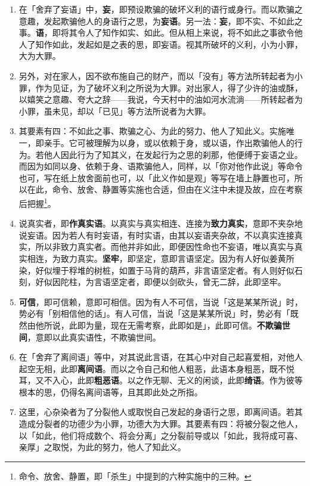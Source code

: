 \begin{enumerate}\item 在「舍弃了妄语」中，\textbf{妄}，即预设欺骗的破坏义利的语行或身行。而以欺骗之意趣，发起欺骗他人的身语行之思，为\textbf{妄语}。另一法：\textbf{妄}，即不实、不如此之事。\textbf{语}，即将其令人了知作如实、如此。但从相上来说，将不如此之事欲令他人了知作如此，发起如是之表的思，即妄语。视其所破坏的义利，小为小罪，大为大罪。
\item 另外，对在家人，因不欲布施自己的财产，而以「没有」等方法所转起者为小罪，作为见证，为了破坏义利之所说为大罪。对出家人，得了少许的油或酥，以嬉笑之意趣、夸大之辞——我说，今天村中的油如河水流淌——所转起者为小罪，虽未见，却以「已见」等方法所说者为大罪。
\item 其要素有四：不如此之事、欺骗之心、为此的努力、他人了知此义。实施唯一，即亲手。它可被理解为以身，或以依赖于身，或以语，作出欺骗他人的行为。若他人因此行为了知其义，在发起行为之思的刹那，他便缚于妄语之业。而因为如同以身、依赖于身、语欺骗他人，同样，以「你对他作此说」等命令也可，写在纸上放舍面前也可，以「此义作如是观」等写在墙上静置也可，所以在此，命令、放舍、静置等实施也合适，但由在义注中未提及故，应在考察后把握\footnote{命令、放舍、静置，即「杀生」中提到的六种实施中的三种。}。
\item 说真实者，即\textbf{作真实语}。以真实与真实相连、连接为\textbf{致力真实}，意即不夹杂地说妄语。因为若人有时妄语，有时实语，由其以妄语夹杂故，不以真实连接真实，所以非致力真实者。而他并非如此，即便因性命也不妄语，唯以真实与真实相连，为致力真实。\textbf{坚牢}，即坚定，意即言语坚定。因为有人好似姜黄所染，好似埋于稃堆的树桩，如置于马背的葫芦，非言语坚定者。有人则好似石刻，好似因陀柱，为言语坚定者，即便以剑砍头，曾无二辞，此即坚牢。
\item \textbf{可信}，即可信赖，意即可相信。因为有人不可信，当说「这是某某所说」时，势必有「别相信他的话」。有人可信，当说「这是某某所说」时，势必有「既然由他所说，此即为量，现在无需考察，此即如是」，此即可信。\textbf{不欺骗世间}，意即以此真实语性，不欺骗世间。
\item 在「舍弃了离间语」等中，对其说此言语，在其心中对自己起喜爱相，对他人起空无相，此即\textbf{离间语}。而以之令自己和他人粗恶，此语本身粗恶，既不悦耳，又不入心，此即\textbf{粗恶语}。以之作无聊、无义的闲谈，此即\textbf{绮语}。作为彼等根本的思，仍得名离间语等，且其即此处之所指。
\item 这里，心杂染者为了分裂他人或取悦自己发起的身语行之思，即离间语。若其造成分裂者的功德少为小罪，功德大为大罪。其要素有四：将被分裂之他人，以「如此，他们将成数个、将会分离」之分裂前导或以「如此，我将成可喜、亲厚」之取悦，为此的努力，他人了知此义。

\end{enumerate}
